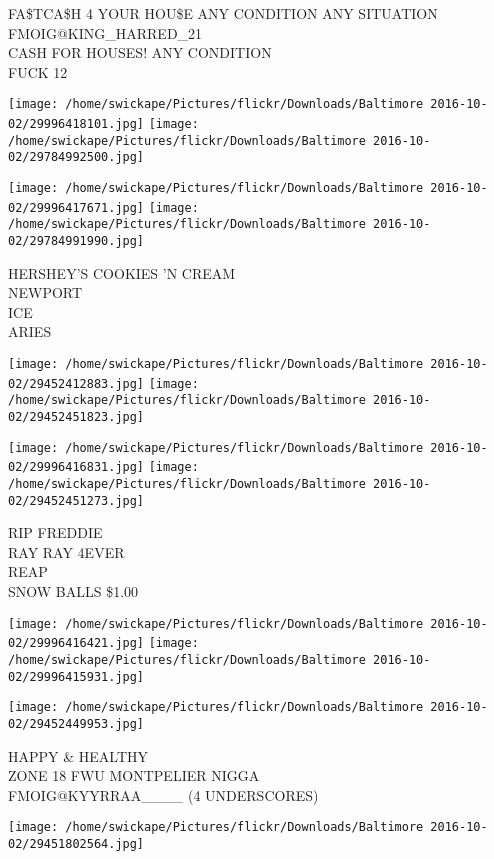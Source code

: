 \documentclass[10pt,letterpaper]{article}
\begin{document}
FA\$TCA\$H 4 YOUR HOU\$E ANY CONDITION ANY SITUATION\\
FMOIG@KING\_HARRED\_21\\
CASH FOR HOUSES!  ANY CONDITION\\
FUCK 12
\pagebreak

\texttt{[image: /home/swickape/Pictures/flickr/Downloads/Baltimore 2016-10-02/29996418101.jpg]}
\texttt{[image: /home/swickape/Pictures/flickr/Downloads/Baltimore 2016-10-02/29784992500.jpg]}

\texttt{[image: /home/swickape/Pictures/flickr/Downloads/Baltimore 2016-10-02/29996417671.jpg]}
\texttt{[image: /home/swickape/Pictures/flickr/Downloads/Baltimore 2016-10-02/29784991990.jpg]}

HERSHEY'S COOKIES 'N CREAM\\
NEWPORT\\
ICE\\
ARIES
\pagebreak

\texttt{[image: /home/swickape/Pictures/flickr/Downloads/Baltimore 2016-10-02/29452412883.jpg]}
\texttt{[image: /home/swickape/Pictures/flickr/Downloads/Baltimore 2016-10-02/29452451823.jpg]}

\texttt{[image: /home/swickape/Pictures/flickr/Downloads/Baltimore 2016-10-02/29996416831.jpg]}
\texttt{[image: /home/swickape/Pictures/flickr/Downloads/Baltimore 2016-10-02/29452451273.jpg]}

RIP FREDDIE\\
RAY RAY 4EVER\\
REAP\\
SNOW BALLS \$1.00
\pagebreak

\texttt{[image: /home/swickape/Pictures/flickr/Downloads/Baltimore 2016-10-02/29996416421.jpg]}
\texttt{[image: /home/swickape/Pictures/flickr/Downloads/Baltimore 2016-10-02/29996415931.jpg]}

\vspace{0.25in}
\texttt{[image: /home/swickape/Pictures/flickr/Downloads/Baltimore 2016-10-02/29452449953.jpg]}

HAPPY \& HEALTHY\\
ZONE 18 FWU MONTPELIER NIGGA\\
FMOIG@KYYRRAA\_\_\_\_ (4 UNDERSCORES)
\pagebreak

\texttt{[image: /home/swickape/Pictures/flickr/Downloads/Baltimore 2016-10-02/29451802564.jpg]}
\end{document}
